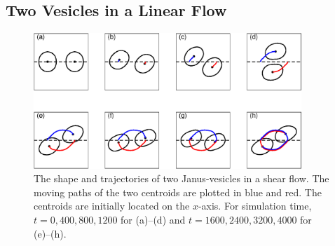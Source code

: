 \documentclass[lineno]{jfm}
\begin{document}
\subsection{Two Vesicles in a Linear Flow}

\begin{figure}
\begin{center}
  \includegraphics[width=0.9\textwidth]{ShearTraj.eps}
\end{center} 
  \caption{\label{figure9} The shape and trajectories of two
  Janus-vesicles in a shear flow. The moving paths of the two centroids
  are plotted in blue and red. The centroids are initially located on
  the $x$-axis. For simulation time, $t = {0, 400,800,1200}$ for
  (a)--(d) and $t = {1600, 2400, 3200, 4000}$ for (e)--(h).}
\end{figure}
\end{document}
